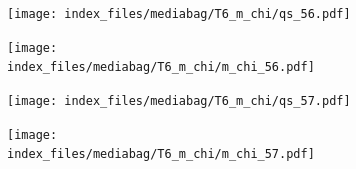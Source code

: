 \documentclass[
  11pt,
  letterpaper,
]{scrreprt}
\begin{document}
\begin{figure}

\begin{minipage}{0.50\linewidth}

\begin{figure}[H]

{\centering \texttt{[image: index\_files/mediabag/T6\_m\_chi/qs\_56.pdf]}

}


\end{figure}%

\end{minipage}%
%
\begin{minipage}{0.50\linewidth}

\begin{figure}[H]

{\centering \texttt{[image: index\_files/mediabag/T6\_m\_chi/m\_chi\_56.pdf]}

}


\end{figure}%

\end{minipage}%

\end{figure}%

\begin{figure}

\begin{minipage}{0.50\linewidth}

\begin{figure}[H]

{\centering \texttt{[image: index\_files/mediabag/T6\_m\_chi/qs\_57.pdf]}

}


\end{figure}%

\end{minipage}%
%
\begin{minipage}{0.50\linewidth}

\begin{figure}[H]

{\centering \texttt{[image: index\_files/mediabag/T6\_m\_chi/m\_chi\_57.pdf]}

}


\end{figure}%

\end{minipage}%

\end{figure}%
\end{document}
